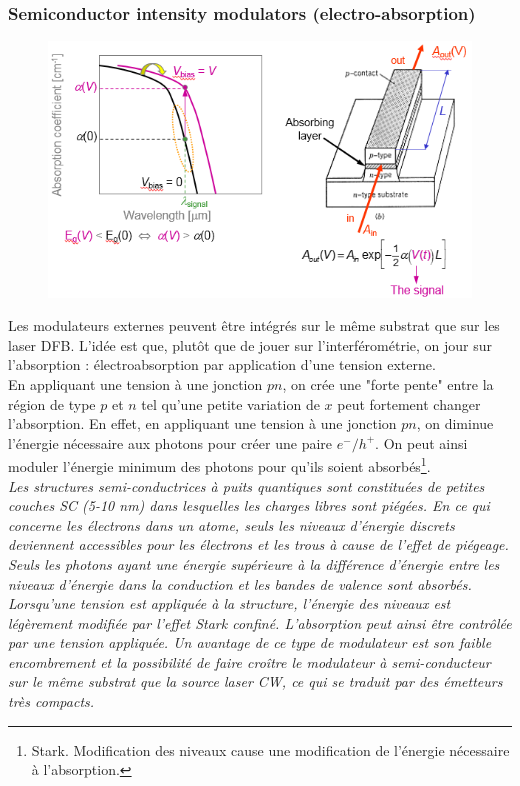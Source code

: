 \subsubsection{Semiconductor intensity modulators (electro-absorption)}
\begin{figure}
	\vspace{-5mm}
	\includegraphics[scale=0.6]{ch4/image31}
	\end{figure}
Les modulateurs externes peuvent être intégrés sur le même substrat que sur les laser DFB. L'idée est
que, plutôt que de jouer sur l'interférométrie, on jour sur l'absorption : électroabsorption par
application d'une tension externe.\\

En appliquant une tension à une jonction $pn$, on crée une "forte pente" entre la région de type
$p$ et $n$ tel qu'une petite variation de $x$ peut fortement changer l'absorption. En effet, en 
appliquant une tension à une jonction $pn$, on diminue l'énergie nécessaire aux photons pour créer
une paire $e^-/h^+$. On peut ainsi moduler l'énergie minimum des photons pour qu'ils soient 
absorbés\footnote{Stark. Modification des niveaux cause une modification de l'énergie nécessaire à
l'absorption.}.\\


\textit{Les structures semi-conductrices à puits quantiques sont constituées de petites couches SC (5-10 nm) dans lesquelles les charges libres sont piégées. En ce qui concerne les électrons dans un atome, seuls les niveaux d'énergie discrets deviennent accessibles pour les électrons et les trous à cause de l'effet de piégeage. Seuls les photons ayant une énergie supérieure à la différence d'énergie entre les niveaux d'énergie dans la conduction et les bandes de valence sont absorbés. Lorsqu'une tension est appliquée à la structure, l'énergie des niveaux est légèrement modifiée par l'effet Stark confiné. L'absorption peut ainsi être contrôlée par une tension appliquée. Un avantage de ce type de modulateur est son faible encombrement et la possibilité de faire croître le modulateur à semi-conducteur sur le même substrat que la source laser CW, ce qui se traduit par des émetteurs très compacts.}

